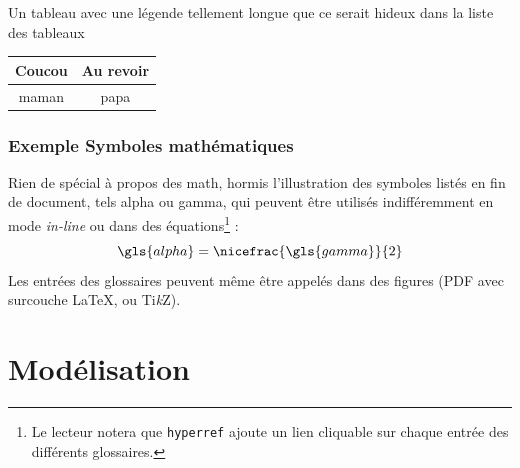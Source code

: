 			\begin{tableth}
				\caption[Légende courte pour l'exemple de tableau]{Un tableau avec une légende tellement longue que ce serait hideux dans la liste des tableaux}
					\label{tab:exemple}
				\begin{tabular}{c|c}
					Coucou	& Au revoir\\
					\hline
					maman	& papa
				\end{tabular}
			\end{tableth}
	
			\subsection{Exemple Symboles mathématiques}
			Rien de spécial à propos des math, hormis l'illustration des symboles listés en fin de document, tels \gls{alpha} ou \gls{gamma}, qui peuvent être utilisés indifféremment en mode \emph{in-line} ou dans des équations\footnote{Le lecteur notera que \texttt{hyperref} ajoute un lien cliquable sur chaque entrée des différents glossaires.} :
			\begin{equation}
				\gls{alpha}=\nicefrac{\gls{gamma}}{2}
				\label{eq:alphagamma}
			\end{equation}
			Les entrées des glossaires peuvent même être appelés dans des figures (PDF avec surcouche \LaTeX, ou Ti\textit{k}Z).
	




	\chapter{Modélisation}
		\minitoc
		\newpage
		

